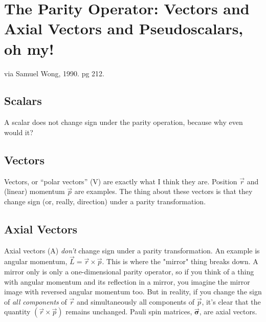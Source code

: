 



\chapter[Misc. Nuclear Physics]{The Parity Operator:  Vectors and Axial Vectors and Pseudoscalars, oh my!}

via Samuel Wong, 1990.  pg 212.

\section{Scalars}
A scalar does not change sign under the parity operation, because why even would it?

\section{Vectors}
Vectors, or ``polar vectors'' (V) are exactly what I think they are.  Position $\vec{r}$ and (linear) momentum $\vec{p}$ are examples.  The thing about these vectors is that they change sign (or, really, direction) under a parity transformation.  

\section{Axial Vectors}
Axial vectors (A) \emph{don't} change sign under a parity transformation.  An example is angular momentum, $\vec{L} = \vec{r} \times \vec{p}$.  This is where the "mirror" thing breaks down.  A mirror only is only a one-dimensional parity operator, so if you think of a thing with angular momentum and its reflection in a mirror, you imagine the mirror image with reversed angular momentum too.  But in reality, if you change the sign of \emph{all components} of $\vec{r}$ and simultaneously all components of $\vec{p}$, it's clear that the quantity $(\vec{r} \times \vec{p})$ remains unchanged.  Pauli spin matrices, $\vec{\mathbf{\sigma}}$, are axial vectors.

